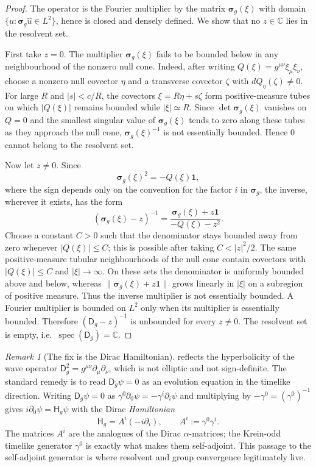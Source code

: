 \documentclass[11pt]{article}
\theoremstyle{definition}
\theoremstyle{remark}
\newtheorem{remark}[theorem]{Remark}
\newcommand{\C}{\mathbb{C}}
\newcommand{\spec}{\operatorname{spec}}
\newcommand{\sym}{\boldsymbol{\sigma}}
\newcommand{\one}{\mathbf{1}}
\newcommand{\Dirac}{\mathsf{D}}
\newcommand{\Ham}{\mathsf{H}}
\newcommand{\norm}[1]{\lVert#1\rVert}
\begin{document}
\begin{proof}
The operator is the Fourier multiplier by the matrix $\sym_g(\xi)$ with domain
$\{u:\sym_g\hat u\in L^2\}$, hence is closed and densely defined.  We show that no
$z\in\C$ lies in the resolvent set.

First take $z=0$.  The multiplier $\sym_g(\xi)$ fails to be bounded below in
any neighbourhood of the nonzero null cone.  Indeed, after writing
$Q(\xi)=g^{\mu\nu}\xi_\mu\xi_\nu$, choose a nonzero null covector
$\eta$ and a transverse covector $\zeta$ with $dQ_\eta(\zeta)\ne0$.  For large
$R$ and $|s|<c/R$, the covectors $\xi=R\eta+s\zeta$ form positive-measure tubes
on which $|Q(\xi)|$ remains bounded while $|\xi|\simeq R$.  Since
$\det\sym_g(\xi)$ vanishes on $Q=0$ and the smallest singular value of
$\sym_g(\xi)$ tends to zero along these tubes as they approach the null cone,
$\sym_g(\xi)^{-1}$ is not essentially bounded.  Hence $0$ cannot belong to the
resolvent set.

Now let $z\ne0$.  Since
\[
  \sym_g(\xi)^2=-Q(\xi)\one,
\]
where the sign depends only on the convention for the factor $i$ in
$\sym_g$, the inverse, wherever it exists, has the form
\[
  (\sym_g(\xi)-z)^{-1}
  =\frac{\sym_g(\xi)+z\one}{-Q(\xi)-z^2} .
\]
Choose a constant $C>0$ such that the denominator stays bounded away from zero
whenever $|Q(\xi)|\le C$; this is possible after taking $C<|z|^2/2$.  The same
positive-measure tubular neighbourhoods of the null cone contain covectors with
$|Q(\xi)|\le C$ and $|\xi|\to\infty$.  On these sets the denominator is uniformly
bounded above and below, whereas
$\norm{\sym_g(\xi)+z\one}$ grows linearly in $|\xi|$ on a subregion of positive
measure.  Thus the inverse multiplier is not essentially bounded.  A Fourier
multiplier is bounded on $L^2$ only when its multiplier is essentially bounded.
Therefore $(\Dirac_g-z)^{-1}$ is unbounded for every $z\ne0$.  The resolvent set
is empty, i.e.\ $\spec(\Dirac_g)=\C$.
\end{proof}

\begin{remark}[The fix is the Dirac Hamiltonian]
\label{rem:hamiltonian-fix}
 reflects the hyperbolicity of the wave operator
$\Dirac_g^2=g^{\mu\nu}\partial_\mu\partial_\nu$, which is not elliptic and not
sign-definite.  The standard remedy is to read $\Dirac_g\psi=0$ as an evolution
equation in the timelike direction.  Writing $\Dirac_g\psi=0$ as
$\gamma^0\partial_0\psi=-\gamma^i\partial_i\psi$ and multiplying by
$-\gamma^0=(\gamma^0)^{-1}$ gives $i\partial_0\psi=\Ham_g\psi$ with the Dirac
\emph{Hamiltonian}
\[
  \Ham_g=A^i(-i\partial_i),\qquad A^i:=\gamma^0\gamma^i .
\]
The matrices $A^i$ are the analogues of the Dirac $\alpha$-matrices; the
Krein-odd timelike generator $\gamma^0$ is exactly what makes them
self-adjoint.  This passage to the self-adjoint generator is where resolvent and
group convergence legitimately live.
\end{remark}
\end{document}
